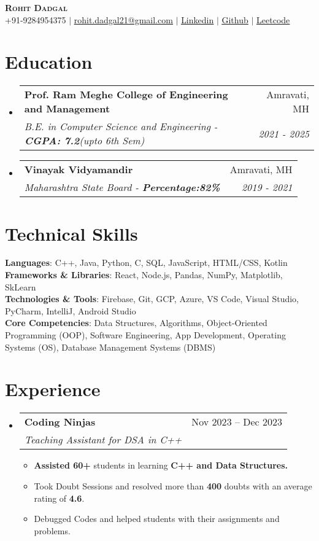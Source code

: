 \documentclass[letterpaper,11pt]{article}
\makeatletter
\newcommand{\resumeItem}[1]{
  \item\small{
    {#1 \vspace{-2pt}}
  }
}
\newcommand{\resumeSubheading}[4]{
  \vspace{-2pt}\item
    \begin{tabular*}{0.97\textwidth}[t]{l@{\extracolsep{\fill}}r}
      \textbf{#1} & #2 \\
      \textit{\small#3} & \textit{\small #4} \\
    \end{tabular*}\vspace{-7pt}
}
\newcommand{\resumeSubHeadingListStart}{\begin{itemize}[leftmargin=0.15in, label={}]}
\newcommand{\resumeSubHeadingListEnd}{\end{itemize}}
\newcommand{\resumeItemListStart}{\begin{itemize}}
\newcommand{\resumeItemListEnd}{\end{itemize}\vspace{-5pt}}
\makeatother
\begin{document}
\begin{center}
    \textbf{\Huge \scshape Rohit Dadgal} \\ \vspace{1pt}
    \small +91-9284954375  $|$ \href{mailto:rohit.dadgal21@gmail.com}{\underline{rohit.dadgal21@gmail.com}} $|$ 
    \href{https://www.linkedin.com/in/rohitdadgal/}{\underline{Linkedin}} $|$
    \href{https://github.com/rohitd2103}{\underline{Github}} $|$
    \href{https://leetcode.com/u/Rohit2103/}{\underline{Leetcode}}
\end{center}

\section{Education}
  \resumeSubHeadingListStart
    \resumeSubheading
      {Prof. Ram Meghe College of Engineering and Management}{Amravati, MH}
      {B.E. in Computer Science and Engineering - \textbf{CGPA: 7.2}(upto 6th Sem)}{2021 - 2025}
    \resumeSubheading
      {Vinayak Vidyamandir}{Amravati, MH}
      {Maharashtra State Board - \textbf{Percentage:82\%} }{ 2019 - 2021}
  \resumeSubHeadingListEnd

\section{Technical Skills}
 \begin{itemize}[leftmargin=0.15in, label={}]
    \small{\item{
     \textbf{Languages}{: C++, Java, Python, C, SQL, JavaScript, HTML/CSS, Kotlin } \\
     \textbf{Frameworks \& Libraries}{: React, Node.js, Pandas, NumPy, Matplotlib, SkLearn  } \\
     \textbf{Technologies \& Tools}{: Firebase, Git, GCP, Azure, VS Code, Visual Studio, PyCharm, IntelliJ, Android Studio} \\
     \textbf{Core Competencies}{: Data Structures, Algorithms, Object-Oriented Programming (OOP), Software Engineering, App Development, Operating Systems (OS), Database Management Systems (DBMS)}
    }}
 \end{itemize}

\section{Experience}
  \resumeSubHeadingListStart
    \resumeSubheading
      {Coding Ninjas}{Nov 2023 -- Dec 2023}
      {Teaching Assistant for DSA in C++}{}
      \resumeItemListStart
        \resumeItem{\textbf{Assisted 60+} students in learning \textbf{C++ and Data Structures.}}
        \resumeItem{Took Doubt Sessions and resolved more than \textbf{400} doubts with an average rating of \textbf{4.6}.}
        \resumeItem{Debugged Codes and helped students with their assignments and problems.}
      \resumeItemListEnd
  \resumeSubHeadingListEnd
\end{document}

